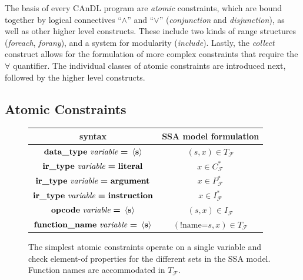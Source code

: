     \noindent
    The basis of every CAnDL program are {\it atomic} constraints, which are
    bound together by logical connectives ``$\land$'' and ``$\lor$''
    ({\it conjunction} and {\it disjunction}), as well as other higher level
    constructs.
    These include two kinds of range structures ({\it foreach}, {\it forany}),
    and a system for modularity ({\it include}).
    Lastly, the {\it collect} construct allows for the formulation of more
    complex constraints that require the $\forall$ quantifier.
    The individual classes of atomic constraints are introduced next,
    followed by the higher level constructs.

\subsection{Atomic Constraints}

\begin{figure}[t]
  \centering
  \begin{tabular}{|c|c|}
    \hline
    syntax & SSA model formulation \\
    \hline
    \hline
    $\text{\bf data\_type}\ \text{\it variable}\ \text{\bf =}\ \left<\text{\bf s}\right>$ &  $(s,x)\in T_\mathcal F$\\
    \hline
    $\text{\bf ir\_type}\ \text{\it variable}\ \text{\bf =}\ \text{\bf literal}$ &  $x\in C_\mathcal F^*$\\
    $\text{\bf ir\_type}\ \text{\it variable}\ \text{\bf =}\ \text{\bf argument}$ & $x\in P_\mathcal F^*$\\
    $\text{\bf ir\_type}\ \text{\it variable}\ \text{\bf =}\ \text{\bf instruction}$ & $x\in I_\mathcal F^*$\\
    \hline
    $\text{\bf opcode}\ \text{\it variable}\ \text{\bf =}\ \left<\text{\bf s}\right>$ & $(s,x)\in I_\mathcal F$\\
    \hline
    $\text{\bf function\_name}\ \text{\it variable}\ \text{\bf =}\ \left<\text{\bf s}\right>$ & $(\text{!name=}s,x)\in T_\mathcal F$\\
    \hline
  \end{tabular}
  \caption{The simplest atomic constraints operate on a single variable and
           check element-of properties for the different sets in the SSA model.
           Function names are accommodated in $T_\mathcal F$.\parfillskip=0pt}
  \label{onevaratomics}
\end{figure}

